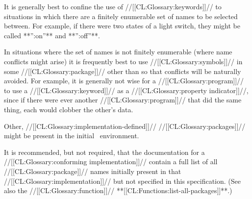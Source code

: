 
It is generally best to confine the use of //[[CL:Glossary:keywords]]// to situations in which there are a finitely enumerable set of names to be selected between.  For example, if there were two states of a light switch, they might be called **'':on''** and **'':off''**.

In situations where the set of names is not finitely enumerable (\ie where name conflicts might arise) it is frequently best to use //[[CL:Glossary:symbols]]// in some //[[CL:Glossary:package]]// other than  so that conflicts will be naturally avoided. For example, it is generally not wise for a //[[CL:Glossary:program]]// to use a //[[CL:Glossary:keyword]]//  as a //[[CL:Glossary:property indicator]]//, since if there were ever another //[[CL:Glossary:program]]// that did the same thing, each would clobber the other's data.

\endsubsubsubsection%

\endsubsubsection%


 Other, //[[CL:Glossary:implementation-defined]]// //[[CL:Glossary:packages]]// might be present in the initial \clisp\ environment.

It is recommended, but not required, that the documentation for a //[[CL:Glossary:conforming implementation]]// contain a full list of all //[[CL:Glossary:package]]// names initially present in that //[[CL:Glossary:implementation]]// but not specified in this specification. (See also the //[[CL:Glossary:function]]// **[[CL:Functions:list-all-packages]]**.)

\endsubsubsection%

\endsubSection%

